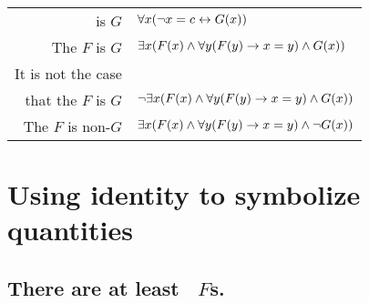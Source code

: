 \begin{center}
\begin{tabular*}{\textwidth}{rl}
 is $G$ & $\forall x(\neg x = c \leftrightarrow \mathord{G}(x) )$\\
The $F$ is $G$ & $\exists x(\mathord{F}(x) \wedge \forall y(\mathord{F}(y) \rightarrow x=y) \wedge \mathord{G}(x) )$\\
It is not the case \\ that
 the $F$ is $G$ & $\neg\exists x(\mathord{F}(x) \wedge \forall y(\mathord{F}(y) \rightarrow x=y) \wedge \mathord{G}(x) )$\\
The $F$ is non-$G$ & $\exists x(\mathord{F}(x) \wedge \forall y(\mathord{F}(y) \rightarrow x=y) \wedge \neg \mathord{G}(x) )$
\end{tabular*}
\end{center}







\newpage
\section{Using identity to symbolize quantities}

\subsection*{There are at least \blank\ $F$s.}
\label{summary.atleast}


